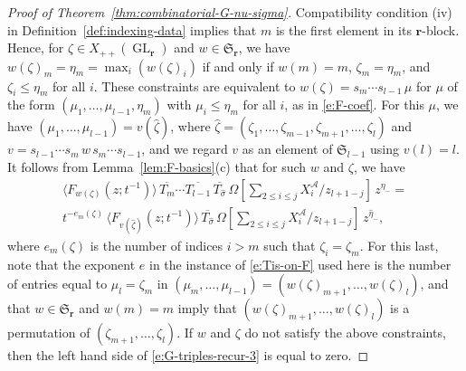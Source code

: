 \documentclass[12pt]{amsart}
\theoremstyle{definition}
\theoremstyle{remark}
\newcommand{\rr}{{\mathbf r}}
\newcommand{\Sfrak}{{\mathfrak S}}
\newcommand{\Acal}{{\mathcal A}}
\newcommand{\sigmahat}{\widehat{\sigma }}
\newcommand{\etahat}{\widehat{\eta }}
\newcommand{\zetahat}{\widehat{\zeta }}
\DeclareMathOperator{\GL}{GL}
\begin{document}
\begin{proof}[Proof of Theorem~\ref{thm:combinatorial-G-nu-sigma}]
Compatibility condition (iv) in Definition~\ref{def:indexing-data}
implies that $m$ is the first element in its $\rr $-block.
Hence, for $\zeta \in X_{++}(\GL _{\rr})$ and $w\in \Sfrak _{\rr }$,
we have $w(\zeta )_{m} = \eta _{m} = \max _{i} (w(\zeta )_{i})$ if and
only if $w(m) = m$, $\zeta _{m} = \eta _{m}$, and $\zeta _{i}\leq \eta
_{m}$ for all $i$.  These constraints are equivalent to $w(\zeta ) =
s_{m}\cdots s_{l-1}\, \mu $ for $\mu $ of the form $(\mu
_{1},\ldots,\mu _{l-1},\eta _{m})$ with $\mu _{i}\leq \eta _{m}$ for
all $i$, as in \eqref{e:F-coef}.  For this $\mu $, we have $(\mu
_{1},\ldots,\mu _{l-1}) = v(\zetahat )$, where $\zetahat =(\zeta
_{1},\ldots,\zeta _{m-1},\zeta _{m+1},\ldots,\zeta _{l})$ and $v =
s_{l-1}\cdots s_{m}\, w\, s_{m}\cdots s_{l-1}$, and we regard $v$ as
an element of $\Sfrak _{l-1}$ using $v(l) = l$.  It follows from
Lemma~\ref{lem:F-basics}(c) that for such $w$ and $\zeta $, we have
\begin{multline}\label{e:G-triples-recur-3}
\langle F_{w(\zeta )}(z; t^{-1}) \rangle\, \overline{T_{m}} \cdots
\overline{T_{l-1}} \,\overline{T_{\sigmahat }}\, \Omega [\sum _{2\leq
i\leq j} X^\Acal_{i} /z_{l+1-j}] \, z^{\eta _{-}} =\\
t^{-e_{m}(\zeta )}\, \langle F_{v(\zetahat )}(z; t^{-1}) \rangle
\,\overline{T_{\sigmahat }}\, \Omega [\sum _{2\leq i\leq j} X^\Acal_{i}
/z_{l+1-j}] \, z^{\etahat _{-}},
\end{multline}
where $e_{m}(\zeta )$ is the number of indices $i>m$ such that $\zeta
_{i} = \zeta _{m}$.  For this last, note that the exponent $e$ in the
instance of \eqref{e:Tis-on-F} used here is the number of entries
equal to $\mu _{l} = \zeta _{m}$ in $(\mu _{m},\ldots,\mu _{l-1}) =
(w(\zeta ) _{m+1},\ldots,w(\zeta ) _{l})$, and that $w\in \Sfrak _{\rr
}$ and $w(m) = m$ imply that $(w(\zeta ) _{m+1},\ldots,w(\zeta )
_{l})$ is a permutation of $(\zeta _{m+1},\ldots, \zeta _{l})$.  If
$w$ and $\zeta $ do not satisfy the above constraints, then the left
hand side of \eqref{e:G-triples-recur-3} is equal to zero.


\end{proof}
\end{document}
